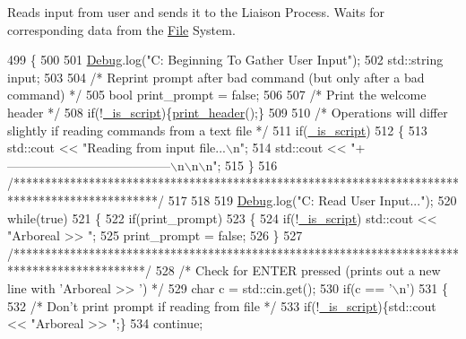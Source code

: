 Reads input from user and sends it to the Liaison Process. Waits for corresponding data from the \mbox{\hyperlink{class_file}{File}} System. 
\begin{DoxyCode}
499 \{
500 
501   \mbox{\hyperlink{_cli_8h_ab6d95a4e6a59b4ad033ed3af31d878e0}{Debug}}.log(\textcolor{stringliteral}{"C: Beginning To Gather User Input"});
502   std::string input;
503 
504   \textcolor{comment}{/* Reprint prompt after bad command (but only after a bad command) */}
505   \textcolor{keywordtype}{bool} print\_prompt = \textcolor{keyword}{false};
506 
507   \textcolor{comment}{/* Print the welcome header */}
508   \textcolor{keywordflow}{if}(!\mbox{\hyperlink{class_c_l_i_a93c65474d55597296ddda4739664ea27}{\_is\_script}})\{\mbox{\hyperlink{_print_8h_aab0a749241244d13922556533aeb7069}{print\_header}}();\}
509 
510   \textcolor{comment}{/* Operations will differ slightly if reading commands from a text file */}
511   \textcolor{keywordflow}{if}(\mbox{\hyperlink{class_c_l_i_a93c65474d55597296ddda4739664ea27}{\_is\_script}})
512   \{
513     std::cout << \textcolor{stringliteral}{"Reading from input file...\(\backslash\)n"};
514     std::cout << \textcolor{stringliteral}{"+---------------------------------------\(\backslash\)n\(\backslash\)n\(\backslash\)n"};
515   \}
516   \textcolor{comment}{/***********************************************************************************************/}
517 
518 
519   \mbox{\hyperlink{_cli_8h_ab6d95a4e6a59b4ad033ed3af31d878e0}{Debug}}.log(\textcolor{stringliteral}{"C: Read User Input..."});
520   \textcolor{keywordflow}{while}(\textcolor{keyword}{true})
521   \{
522     \textcolor{keywordflow}{if}(print\_prompt)
523     \{
524       \textcolor{keywordflow}{if}(!\mbox{\hyperlink{class_c_l_i_a93c65474d55597296ddda4739664ea27}{\_is\_script}}) std::cout << \textcolor{stringliteral}{"Arboreal >> "};
525       print\_prompt = \textcolor{keyword}{false};
526     \}
527     \textcolor{comment}{/*********************************************************************************************/}
528     \textcolor{comment}{/* Check for ENTER pressed (prints out a new line with 'Arboreal >> ') */}
529     \textcolor{keywordtype}{char} c = std::cin.get();
530     \textcolor{keywordflow}{if}(c == \textcolor{charliteral}{'\(\backslash\)n'})
531     \{
532       \textcolor{comment}{/* Don't print prompt if reading from file */}
533       \textcolor{keywordflow}{if}(!\mbox{\hyperlink{class_c_l_i_a93c65474d55597296ddda4739664ea27}{\_is\_script}})\{std::cout << \textcolor{stringliteral}{"Arboreal >> "};\}
534       \textcolor{keywordflow}{continue};

\end{DoxyCode}
